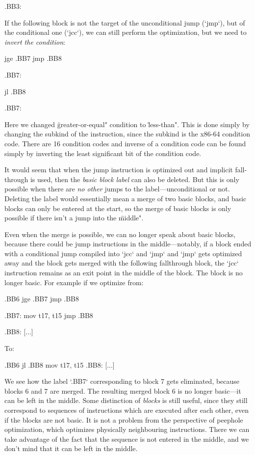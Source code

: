 .BB3:
\endtt

If the following block is not the target of the unconditional jump (`jmp`), but
of the conditional one (`jcc`), we can still perform the optimization, but we
need to {\em invert the condition}:

\begtt
	[...]
	jge .BB7
	jmp .BB8

.BB7:
\endtt

\begtt
	[...]
	jl .BB8

.BB7:
\endtt

Here we changed \"greater-or-equal" condition to \"less-than". This is done
simply by changing the subkind of the instruction, since the subkind is the
x86-64 condition code. There are 16 condition codes and inverse of a condition
code can be found simply by inverting the least significant bit of the condition
code.

It would seem that when the jump instruction is optimized out and implicit
fall-through is used, then the {\em basic block label} can also be deleted. But
this is only possible when there are {\em no other} jumps to the
label---unconditional or not. Deleting the label would essentially mean a merge
of two basic blocks, and basic blocks can only be entered at the start, so
the merge of basic blocks is only possible if there isn't a jump into the
\"middle".

Even when the merge is possible, we can no longer speak about basic blocks,
because there could be jump instructions in the middle---notably, if a block
ended with a conditional jump compiled into `jcc` and `jmp` and `jmp` gets
optimized away and the block gets merged with the following fallthrough block,
the `jcc` instruction remains as an exit point in the middle of the block. The block is no longer
basic. For example if we optimize from:

\begtt
.BB6
	jge .BB7
	jmp .BB8

.BB7:
	mov t17, t15
	jmp .BB8

.BB8:
	[...]
\endtt

To:

\begtt
.BB6
	jl .BB8
	mov t17, t15
.BB8:
	[...]
\endtt

We see how the label `.BB7` corresponding to block 7 gets eliminated, because
blocks 6 and 7 are merged. The resulting merged block 6 is no longer
basic---it can be left in the middle. Some distinction of {\em blocks} is still
useful, since they still correspond to sequences of instructions which are
executed after each other, even if the blocks are not basic. It is not a problem
from the perspective of peephole optimization, which optimizes physically
neighbouring instructions. There we can
take advantage of the fact that the sequence is not entered in the middle, and
we don't mind that it can be left in the middle.

